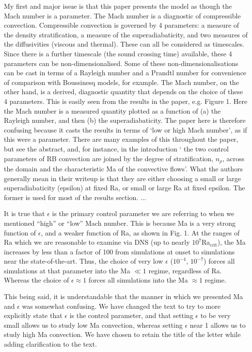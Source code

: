 \documentclass[aps, 11pt, singlecolumn]{revtex4-1} %
\begin{document}
\begin{singlespace}
\begin{myquotation}
My first and major issue is that this paper presents the model as
though the Mach number is a parameter. The Mach number is a diagnostic
of compressible convection. Compressible convection is governed by 4
parameters: a measure of the density stratification, a measure of the
superadiabaticity, and two measures of the diffusivities (viscous and
thermal). These can all be considered as timescales. Since there is a
further timescale (the sound crossing time) available, these 4
parameters can be non-dimensionalised. Some of these
non-dimensionalisations can be cast in terms of a Rayleigh number and
a Prandtl number for convenience of comparison with Boussinesq models,
for example. The Mach number, on the other hand, is a derived,
diagnostic quantity that depends on the choice of these 4 parameters.
This is easily seen from the results in the paper, e.g. Figure 1. Here
the Mach number is a measured quantity plotted as a function of (a)
the Rayleigh number, and then (b) the superadiabaticity. The paper
here is therefore confusing because it casts the results in terms of
`low or high Mach number', as if this were a parameter. There
are many examples of this throughout the paper, but see the abstract,
and, for instance, in the introduction ` the two control parameters
of RB convection are joined by the degree of stratification, $n_\rho$,
across the domain and the characteristic Ma of the convective
flows'. What the authors generally mean in their writeup is that
they are either choosing a small or large superadiabaticity (epsilon)
at fixed Ra, or small or large Ra at fixed epsilon. The former is used
for most of the results section.  ...
\end{myquotation}
It is true that $\epsilon$ is the primary control parameter we are
referring to when we mentioned ``high'' or ``low'' Mach number. This
is because Ma is a very strong function of $\epsilon$, and a weaker
function of Ra, as shown in Fig. 1.  At the ranges of Ra which we are
reasonable to examine via DNS (up to nearly $10^7$Ra$_{\text{crit}}$),
the Ma increases by less than a factor of 100 from simulations at
onset to simulations near the state-of-the-art.  Thus, the choice of
very low $\epsilon$ ($10^{-4}$, $10^{-7}$) forces all simulations at
that parameter into the Ma $\ll 1$ regime, regardless of Ra.  Whereas the
choice of $\epsilon \approx 1$ forces all simulations into the Ma $\approx 1$
regime.

This being said, it is understandable that the manner in which we presented
Ma and $\epsilon$ was somewhat confusing.  We have changed the text to try
to more explicitly state that $\epsilon$ is the control parameter, and that
setting $\epsilon$ to be very small allows us to study low Ma convection,
whereas setting $\epsilon$ near 1 allows us to study high Ma convection.  We
have chosen to retain the title of the letter while adding clarification to
the text.


\end{singlespace}
\end{document}

